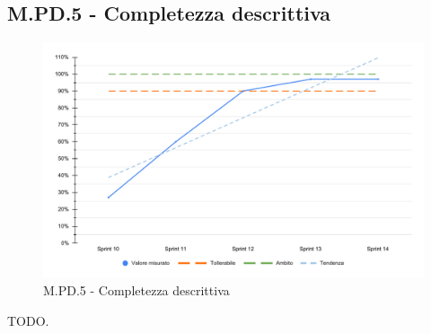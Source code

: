 \subsection{M.PD.5 - Completezza descrittiva}
 \begin{figure}[H]
    \centering
    \includegraphics[width=\textwidth]{assets/completezza_descrittiva.pdf}
    \caption{M.PD.5 - Completezza descrittiva}
\end{figure}

\par TODO.